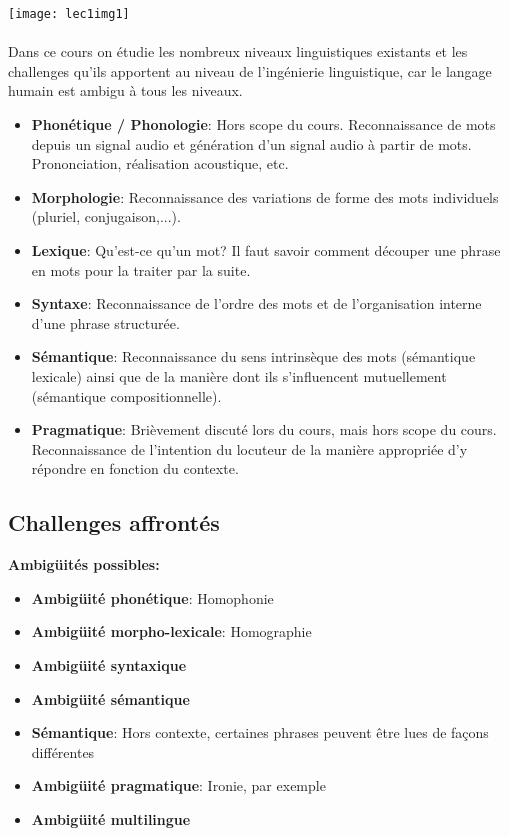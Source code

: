 \texttt{[image: lec1img1]}\\ \\

Dans ce cours on étudie les nombreux niveaux linguistiques existants et les challenges qu'ils apportent au niveau
de l'ingénierie linguistique, car le langage humain est ambigu à tous les niveaux.\\

\begin{itemize}
    \item \textbf{Phonétique / Phonologie}: Hors scope du cours. Reconnaissance de mots depuis un signal audio et
    génération d'un signal audio à partir de mots. Prononciation, réalisation acoustique, etc.
    \item \textbf{Morphologie}: Reconnaissance des variations de forme des mots individuels (pluriel, conjugaison,...).
    \item \textbf{Lexique}: Qu'est-ce qu'un mot? Il faut savoir comment découper une phrase en mots pour la traiter par la suite.
    \item \textbf{Syntaxe}: Reconnaissance de l'ordre des mots et de l'organisation interne d'une phrase structurée.
    \item \textbf{Sémantique}: Reconnaissance du sens intrinsèque des mots (sémantique lexicale) ainsi que de la manière dont
    ils s'influencent mutuellement (sémantique compositionnelle).
    \item \textbf{Pragmatique}: Brièvement discuté lors du cours, mais hors scope du cours. Reconnaissance de l'intention du
    locuteur de la manière appropriée d'y répondre en fonction du contexte.
\end{itemize}

\subsection{Challenges affrontés}

\textbf{Ambigüités possibles:}

\begin{itemize}
    \item \textbf{Ambigüité phonétique}: Homophonie
    \item \textbf{Ambigüité morpho-lexicale}: Homographie
    \item \textbf{Ambigüité syntaxique}
    \item \textbf{Ambigüité sémantique}
    \item \textbf{Sémantique}: Hors contexte, certaines phrases peuvent être lues de façons différentes
    \item \textbf{Ambigüité pragmatique}: Ironie, par exemple
    \item \textbf{Ambigüité multilingue}
\end{itemize}


